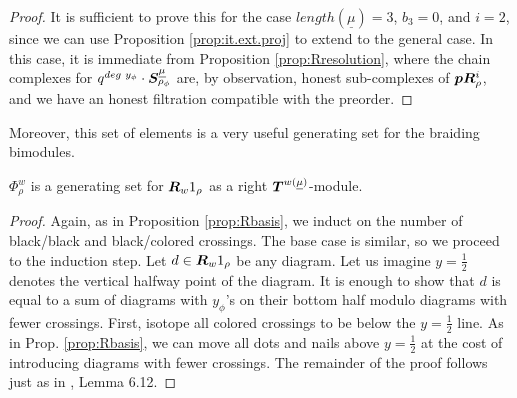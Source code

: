 \documentclass{article}
\begin{document}
\begin{proof}
    It is sufficient to prove this for the case $length(\underline{\mu})=3$, $b_3 =0$, and $i=2$, since we can use Proposition \ref{prop:it.ext.proj} to extend to the general case. In this case, it is immediate from Proposition \ref{prop:Rresolution}, where the chain complexes for $q^{deg \hspace{1mm}y_\phi}\cdot {\boldsymbol{S}}^{\underline{\mu}}_{\rho_\phi}$ are, by observation, honest sub-complexes of $\boldsymbol{p}{\boldsymbol{R}}^i_\rho$, and we have an honest filtration compatible with the preorder. 
\end{proof}

Moreover, this set of elements is a very useful generating set for the braiding bimodules. 
\begin{lem}\label{lem:gen.set}
$\Phi^w_\rho$ is a generating set for ${\boldsymbol{R}}_{w}1_{\rho}$ as a right ${\boldsymbol{T}}^{w(\underline{\mu})}$-module. 
\end{lem}
\begin{proof}
    Again, as in Proposition \ref{prop:Rbasis}, we induct on the number of black/black and black/colored crossings. The base case is similar, so we proceed to the induction step. Let $d \in {\boldsymbol{R}}_{w}1_{\rho}$ be any diagram. Let us imagine $y=\frac{1}{2}$ denotes the vertical halfway point of the diagram. It is enough to show that $d$ is equal to a sum of diagrams with $y_\phi$'s on their bottom half modulo diagrams with fewer crossings. First, isotope all colored crossings to be below the $y=\frac{1}{2}$ line. As in Prop. \ref{prop:Rbasis}, we can move all dots and nails above $y=\frac{1}{2}$ at the cost of introducing diagrams with fewer crossings. The remainder of the proof follows just as in \cite{Web}, Lemma 6.12.
\end{proof}
\end{document}
